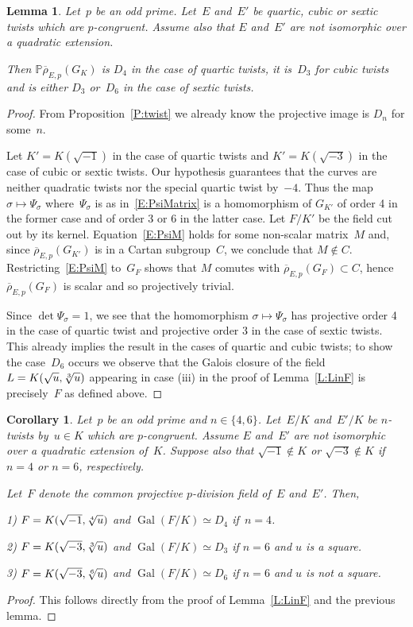 \documentclass[12pt, reqno]{amsart}
\newcommand{\PP}{\mathbb{P}}
\newcommand{\rhobar}{{\overline{\rho}}}
\DeclareMathOperator{\Gal}{Gal}
\numberwithin{equation}{section}
\newtheorem{lemma}[theorem]{Lemma}
\newtheorem{corollary}[theorem]{Corollary}
\theoremstyle{definition}
\theoremstyle{remark}
\begin{document}
\begin{lemma}\label{L:dihedral}
Let~$p$ be an odd prime. Let~$E$ and~$E'$ be quartic, cubic or sextic
twists which are $p$-congruent. Assume also that $E$ and~$E'$ are not
isomorphic over a quadratic extension.

Then $\PP\rhobar_{E,p}(G_K)$ is $D_4$ in the case of quartic twists,
it is~$D_3$ for cubic twists and is either $D_3$ or~$D_6$ in the case
of sextic twists.
\end{lemma}
\begin{proof} From Proposition~\ref{P:twist} we already know the
  projective image is $D_n$ for some~$n$.

Let $K'=K(\sqrt{-1})$ in the case of quartic twists and
$K'=K(\sqrt{-3})$ in the case of cubic or sextic twists. Our
hypothesis guarantees that the curves are neither quadratic twists nor
the special quartic twist by~$-4$.  Thus the map $\sigma \mapsto
\Psi_\sigma$ where~$\Psi_\sigma$ is as in~\eqref{E:PsiMatrix} is a
homomorphism of $G_{K'}$ of order 4 in the former case and of order 3
or 6 in the latter case.  Let $F/K'$ be the field cut out by its
kernel. Equation~\eqref{E:PsiM} holds for some non-scalar matrix~$M$
and, since $\rhobar_{E,p}(G_{K'})$ is in a Cartan subgroup~$C$, we
conclude that $M \not\in C$. Restricting~\eqref{E:PsiM} to~$G_F$ shows
that $M$ comutes with $\rhobar_{E,p}(G_F) \subset C$, hence
$\rhobar_{E,p}(G_F)$ is scalar and so projectively trivial.

Since $\det \Psi_\sigma = 1$, we see that the homomorphism $\sigma
\mapsto \Psi_\sigma$ has projective order 4 in the case of quartic
twist and projective order 3 in the case of sextic twists. This
already implies the result in the cases of quartic and cubic twists;
to show the case~$D_6$ occurs we observe that the Galois closure of
the field~$L=K(\sqrt{u},\root 3 \of u)$ appearing in case (iii) in the
proof of Lemma~\ref{L:LinF} is precisely~$F$ as defined above.
\end{proof}

\begin{corollary}
Let~$p$ be an odd prime and $n \in \{4,6 \}$. Let~$E/K$ and~$E'/K$ be $n$-twists by~$u \in K$ which are $p$-congruent. 
Assume $E$ and~$E'$
are not isomorphic over a quadratic extension of~$K$. Suppose also that $\sqrt{-1} \not\in K$ or
$\sqrt{-3} \not\in K$ if $n=4$ or $n=6$, respectively.

Let~$F$ denote the common projective $p$-division field of~$E$ and~$E'$. Then,

1) $F = K(\sqrt{-1}, \root 4 \of u)$ and $\Gal(F/K) \simeq D_4$ if~$n = 4$.

2) $F = K(\sqrt{-3}, \root 3 \of u)$
and $\Gal(F/K) \simeq D_3$ if $n=6$ and $u$ is a square.

3) $F = K(\sqrt{-3}, \root 6 \of u)$
and $\Gal(F/K) \simeq D_6$ if $n=6$ and $u$ is not a square.
\end{corollary}
\begin{proof} This follows directly from the proof of Lemma~\ref{L:LinF} and the previous lemma.
\end{proof}
\end{document}
